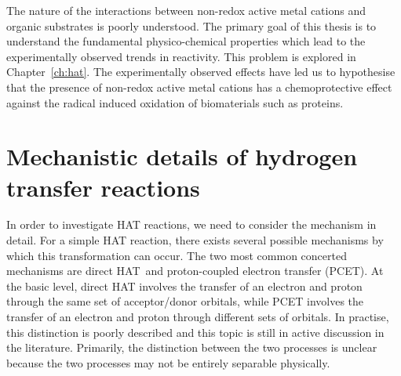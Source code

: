 {The nature of the interactions between non-redox active metal cations and organic substrates is poorly understood. The primary goal of this thesis is to understand the fundamental physico-chemical properties which lead to the experimentally observed trends in reactivity. This problem is explored in Chapter~\ref{ch:hat}. The experimentally observed effects have led us to hypothesise that the presence of non-redox active metal cations has a chemoprotective effect against the radical induced oxidation of biomaterials such as proteins.

\section{Mechanistic details of hydrogen transfer reactions}

In order to investigate HAT reactions, we need to consider the mechanism in detail. For a simple HAT reaction, there exists several possible mechanisms by which this transformation can occur. The two most common concerted mechanisms are direct HAT\footnotemark~and proton-coupled electron transfer (PCET). At the basic level, direct HAT involves the transfer of an electron and proton through the same set of acceptor/donor orbitals, while PCET involves the transfer of an electron and proton through different sets of orbitals. In practise, this distinction is poorly described and this topic is still in active discussion in the literature.\cite{Cukier1998, Mayer2002, Stubbe2003, Mayer2004, DiLabio2007, Huynh2007, HammesSchiffer2008, Mayer2010, Weinberg2012, HammesSchiffer2015, MunozRugeles2017} Primarily, the distinction between the two processes is unclear because the two processes may not be entirely separable physically.\cite{DiLabio2007}


}
